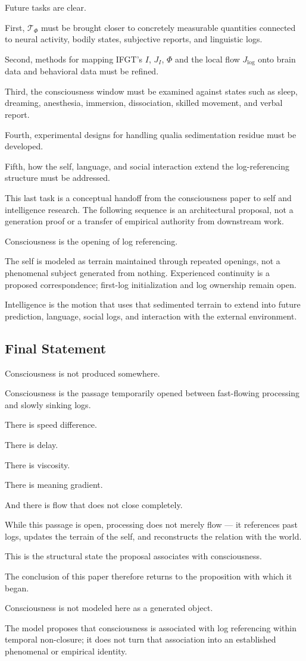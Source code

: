 Future tasks are clear.

First, $\mathcal{T}_{\Phi}$ must be brought closer to concretely measurable quantities connected to neural activity, bodily states, subjective reports, and linguistic logs.

Second, methods for mapping IFGT's $I$, $J_I$, $\Phi$ and the local flow $J_{\log}$ onto brain data and behavioral data must be refined.

Third, the consciousness window must be examined against states such as sleep, dreaming, anesthesia, immersion, dissociation, skilled movement, and verbal report.

Fourth, experimental designs for handling qualia sedimentation residue must be developed.

Fifth, how the self, language, and social interaction extend the log-referencing structure must be addressed.

This last task is a conceptual handoff from the consciousness paper to self and intelligence research. The following sequence is an architectural proposal, not a generation proof or a transfer of empirical authority from downstream work.

Consciousness is the opening of log referencing.

The self is modeled as terrain maintained through repeated openings, not a phenomenal subject generated from nothing. Experienced continuity is a proposed correspondence; first-log initialization and log ownership remain open.

Intelligence is the motion that uses that sedimented terrain to extend into future prediction, language, social logs, and interaction with the external environment.

\subsection{Final Statement}


Consciousness is not produced somewhere.

Consciousness is the passage temporarily opened between fast-flowing processing and slowly sinking logs.

There is speed difference.

There is delay.

There is viscosity.

There is meaning gradient.

And there is flow that does not close completely.

While this passage is open, processing does not merely flow — it references past logs, updates the terrain of the self, and reconstructs the relation with the world.

This is the structural state the proposal associates with consciousness.

The conclusion of this paper therefore returns to the proposition with which it began.

Consciousness is not modeled here as a generated object.

The model proposes that consciousness is associated with log referencing within temporal non-closure; it does not turn that association into an established phenomenal or empirical identity.
